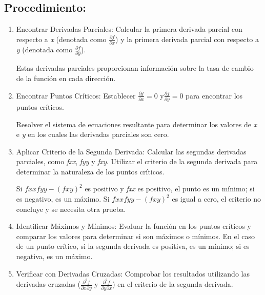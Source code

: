     \subsection{Procedimiento:}
        \begin{enumerate}
            \item Encontrar Derivadas Parciales: 
            Calcular la primera derivada parcial con respecto a \textit{x} (denotada como $\frac{\partial f}{\partial x}$) y la primera derivada parcial con respecto a \textit{y} (denotada como $\frac{\partial f}{\partial y}$).

            
            Estas derivadas parciales proporcionan información sobre la tasa de cambio de la función en cada dirección. \vspace{0.1cm}
            
            \item Encontrar Puntos Críticos: 
            Establecer $\frac{\partial f}{\partial x}=0$ y$\frac{\partial f}{\partial y}=0$ para encontrar los puntos críticos.
            
            Resolver el sistema de ecuaciones resultante para determinar los valores de \textit{x} e \textit{y} en los cuales las derivadas parciales son cero.
            \vspace{0.1cm}
            
            \item Aplicar Criterio de la Segunda Derivada: 
            Calcular las segundas derivadas parciales, como \textit{fxx}, \textit{fyy} y \textit{fxy}.
            Utilizar el criterio de la segunda derivada para determinar la naturaleza de los puntos críticos.
            
            Si $fxxfyy - (fxy)^2$ es positivo y \textit{fxx} es positivo, el punto es un mínimo; si es negativo, es un máximo. Si $fxxfyy - (fxy)^2$ es igual a cero, el criterio no concluye y se necesita otra prueba.
            \vspace{0.1cm}
            
            \item Identificar Máximos y Mínimos: 
            Evaluar la función en los puntos críticos y comparar los valores para determinar si son máximos o mínimos.
            En el caso de un punto crítico, si la segunda derivada es positiva, es un mínimo; si es negativa, es un máximo.
            \vspace{0.1cm}
            
            \item Verificar con Derivadas Cruzadas: 
            Comprobar los resultados utilizando las derivadas cruzadas ($\frac{\partial^2 f}{\partial x \partial y}$ y $\frac{\partial^2 f}{\partial y \partial x}$) en el criterio de la segunda derivada. 
            \vspace{0.1cm}
        \end{enumerate}
        
